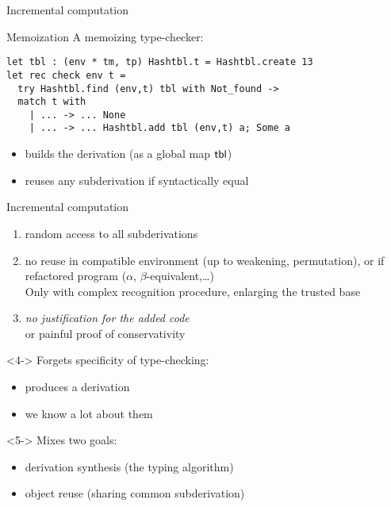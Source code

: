 \documentclass{beamer}
\theoremstyle{example}
\begin{document}
\begin{frame}[fragile]{Incremental computation}
  \begin{block}{Memoization}
    \vspace{0.5em}
    A \alert{memoizing} type-checker:

    \begin{lstlisting}
let tbl : (env * tm, tp) Hashtbl.t = Hashtbl.create 13
let rec check env t =
  try Hashtbl.find (env,t) tbl with Not_found ->
  match t with
    | ... -> ... None
    | ... -> ... Hashtbl.add tbl (env,t) a; Some a
    \end{lstlisting}

    \begin{itemize}
    \item builds the derivation (as a global map ${\rm\mathsf{tbl}}$)
    \item reuses any subderivation if syntactically equal
    \end{itemize}
  \end{block}
\end{frame}

\begin{frame}{Incremental computation}
  \begin{enumerate}[<+->]
  \item[\itplus] random access to all subderivations
  \item[\itminus] no reuse in compatible environment {\small (up to weakening,
    permutation)}, or if refactored program {\small ($\alpha$,
    $\beta$-equivalent,\ldots)} \\
    {\footnotesize Only with complex recognition procedure, enlarging
      the trusted base}
  \item[\itminus] {\large\it no justification for the added code} \\
    {\footnotesize or painful proof of conservativity}
  \end{enumerate}

  \begin{visibleenv}<4->
    {\footnotesize Forgets specificity of type-checking:}
    \begin{itemize}
    \item {\large produces a derivation}
    \item {\large we know a lot about them}
    \end{itemize}
  \end{visibleenv}

  \begin{visibleenv}<5->
    {\footnotesize Mixes two goals:}

    \begin{itemize}
    \item {\large derivation synthesis} \footnotesize (the typing
      algorithm)
    \item {\large object reuse} \footnotesize (sharing common
      subderivation)
    \end{itemize}
  \end{visibleenv}
\end{frame}
\end{document}
